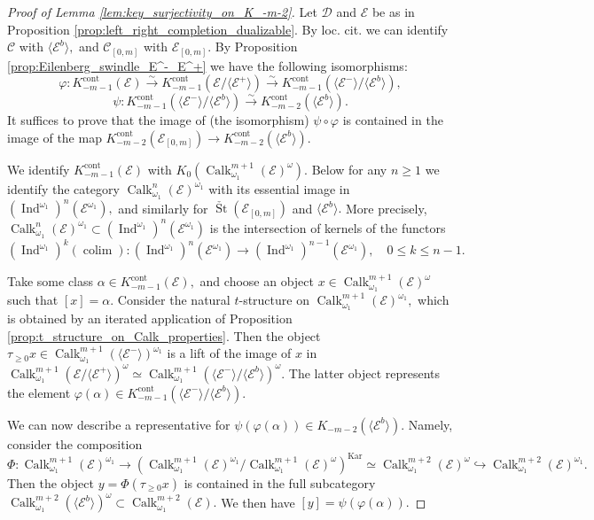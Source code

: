 \documentclass[11pt,leqno]{amsart}
\numberwithin{equation}{section}
\DeclareMathOperator*{\colim}{colim}
\newcommand{\xto}{\xrightarrow}
\newcommand{\hto}{\hookrightarrow}
\newcommand{\cont}{\operatorname{cont}}
\newcommand{\St}{\operatorname{St}}
\newcommand{\cD}{{\mathcal D}}
\newcommand{\cC}{{\mathcal C}}
\newcommand{\cE}{{\mathcal E}}
\newcommand{\la}{\langle}
\newcommand{\ra}{\rangle}
\newcommand{\Kar}{\operatorname{Kar}}
\newcommand{\Ind}{\operatorname{Ind}}
\newcommand{\Calk}{\operatorname{Calk}}
\begin{document}
\begin{proof}[Proof of Lemma \ref{lem:key_surjectivity_on_K_-m-2}]
Let $\cD$ and $\cE$ be as in Proposition \ref{prop:left_right_completion_dualizable}. By loc. cit. we can identify $\cC$ with $\la \cE^b\ra,$ and $\cC_{[0,m]}$ with $\cE_{[0,m]}.$  By Proposition \ref{prop:Eilenberg_swindle_E^-_E^+} we have the following isomorphisms:
\begin{equation}\label{eq:from_K_0_of_E_to_K_0_of_quotient}
\varphi:K_{-m-1}^{\cont}(\cE)\xto{\sim}K_{-m-1}^{\cont}(\cE/\la\cE^+\ra)\xto{\sim}K_{-m-1}^{\cont}(\la\cE^-\ra/\la\cE^b\ra),
\end{equation}
\begin{equation*}
\psi:K_{-m-1}^{\cont}(\la\cE^-\ra/\la\cE^b\ra)\xto{\sim} K_{-m-2}^{\cont}(\la\cE^b\ra).
\end{equation*}
It suffices to prove that the image of (the isomorphism) $\psi\circ\varphi$ is contained in the image of the map $K_{-m-2}^{\cont}(\cE_{[0,m]})\to K_{-m-2}^{\cont}(\la \cE^b\ra).$

 We identify $K_{-m-1}^{\cont}(\cE)$ with $K_0(\Calk_{\omega_1}^{m+1}(\cE)^{\omega}).$ Below for any $n\geq 1$ we identify the category $\Calk_{\omega_1}^n(\cE)^{\omega_1}$ with its essential image in $(\Ind^{\omega_1})^n(\cE^{\omega_1}),$ and similarly for $\check{\St}(\cE_{[0,m]})$ and $\la \cE^b\ra.$ More precisely, $\Calk_{\omega_1}^n(\cE)^{\omega_1}\subset (\Ind^{\omega_1})^n(\cE^{\omega_1})$ is the intersection of kernels of the functors
\begin{equation*}
(\Ind^{\omega_1})^k(\colim):(\Ind^{\omega_1})^n(\cE^{\omega_1})\to (\Ind^{\omega_1})^{n-1}(\cE^{\omega_1}),\quad 0\leq k\leq n-1.
\end{equation*}

Take some class $\alpha\in K_{-m-1}^{\cont}(\cE),$ and choose an object $x\in \Calk_{\omega_1}^{m+1}(\cE)^{\omega}$ such that $[x]=\alpha.$ Consider the natural $t$-structure on $\Calk_{\omega_1}^{m+1}(\cE)^{\omega_1},$ which is obtained by an iterated application of Proposition \ref{prop:t_structure_on_Calk_properties}. Then the object $\tau_{\geq 0}x\in\Calk_{\omega_1}^{m+1}(\la\cE^-\ra)^{\omega_1}$ is a lift of the image of $x$ in $\Calk_{\omega_1}^{m+1}(\cE/\la \cE^+\ra)^{\omega}\simeq\Calk_{\omega_1}^{m+1}(\la \cE^-\ra/\la \cE^b\ra)^{\omega}.$ The latter object represents the element $\varphi(\alpha)\in K_{-m-1}^{\cont}(\la \cE^-\ra/\la \cE^b\ra).$

We can now describe a representative for $\psi(\varphi(\alpha))\in K_{-m-2}(\la \cE^b\ra).$ Namely, consider the composition 
\begin{equation*}
\Phi:\Calk_{\omega_1}^{m+1}(\cE)^{\omega_1}\to (\Calk_{\omega_1}^{m+1}(\cE)^{\omega_1}/\Calk_{\omega_1}^{m+1}(\cE)^{\omega})^{\Kar}\simeq\Calk_{\omega_1}^{m+2}(\cE)^{\omega}\hto \Calk_{\omega_1}^{m+2}(\cE)^{\omega_1}.
\end{equation*}
Then the object $y=\Phi(\tau_{\geq 0}x)$ is contained in the full subcategory $\Calk_{\omega_1}^{m+2}(\la \cE^b \ra)^{\omega}\subset \Calk_{\omega_1}^{m+2}(\cE).$ We then have $[y]=\psi(\varphi(\alpha)).$


\end{proof}
\end{document}
